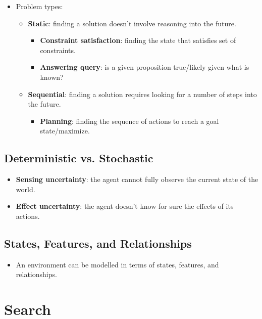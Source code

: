 \documentclass{article}
\begin{document}
\begin{itemize}
    \item Problem types:
        \begin{itemize}
            \item \textbf{Static}: finding a solution doesn't involve reasoning into the future.
                \begin{itemize}
                    \item \textbf{Constraint satisfaction}: finding the state that satisfies set of constraints.
                    \item \textbf{Answering query}: is a given proposition true/likely given what is known?
                \end{itemize}
            \item \textbf{Sequential}: finding a solution requires looking for a number of steps into the future.
                \begin{itemize}
                    \item \textbf{Planning}: finding the sequence of actions to reach a goal state/maximize.
                \end{itemize}
        \end{itemize}
\end{itemize}

\subsection{Deterministic vs. Stochastic}

\begin{itemize}
    \item \textbf{Sensing uncertainty}: the agent cannot fully observe the current state of the world.
    \item \textbf{Effect uncertainty}: the agent doesn't know for sure the effects of its actions.
\end{itemize}

\subsection{States, Features, and Relationships}

\begin{itemize}
    \item An environment can be modelled in terms of states, features, and relationships.
\end{itemize}

\section{Search}
\end{document}
